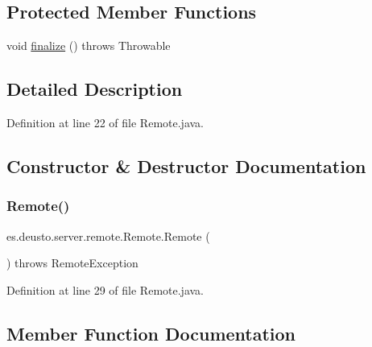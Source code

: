 \subsection*{Protected Member Functions}
\begin{DoxyCompactItemize}
\item 
void \hyperlink{classes_1_1deusto_1_1server_1_1remote_1_1_remote_ac8c5c24cdafa413da4ad7d71f7f710d3}{finalize} ()  throws Throwable 
\end{DoxyCompactItemize}


\subsection{Detailed Description}


Definition at line 22 of file Remote.\+java.



\subsection{Constructor \& Destructor Documentation}
\mbox{\label{classes_1_1deusto_1_1server_1_1remote_1_1_remote_a39055ae30196c2afe97a621b80e43374}} 
\subsubsection{\texorpdfstring{Remote()}{Remote()}}
{\footnotesize\ttfamily es.\+deusto.\+server.\+remote.\+Remote.\+Remote (\begin{DoxyParamCaption}{ }\end{DoxyParamCaption}) throws Remote\+Exception}



Definition at line 29 of file Remote.\+java.



\subsection{Member Function Documentation}
\mbox{\label{classes_1_1deusto_1_1server_1_1remote_1_1_remote_a1ecaa4a69094e3f3410720b54027e5b3}} 
